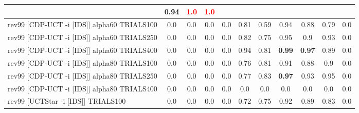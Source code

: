 \documentclass{article}
\begin{document}
\begin{tabular}{|l|r@{$\pm$}rr@{$\pm$}rr@{$\pm$}rr@{$\pm$}rr@{$\pm$}rr@{$\pm$}rr@{$\pm$}rr@{$\pm$}rr@{$\pm$}rr@{$\pm$}r|}
& \multicolumn{2}{c}{0.94}
& \multicolumn{2}{c}{\textbf{\textcolor{red}{1.0}}}
& \multicolumn{2}{c|}{\textbf{\textcolor{red}{1.0}}}
\\
\hline
rev99 [CDP-UCT -i [IDS]] alpha60 TRIALS100
& \multicolumn{2}{c}{0.0}
& \multicolumn{2}{c}{0.0}
& \multicolumn{2}{c}{0.0}
& \multicolumn{2}{c}{0.0}
& \multicolumn{2}{c}{0.81}
& \multicolumn{2}{c}{0.59}
& \multicolumn{2}{c}{0.94}
& \multicolumn{2}{c}{0.88}
& \multicolumn{2}{c}{0.79}
& \multicolumn{2}{c|}{0.0}
\\
rev99 [CDP-UCT -i [IDS]] alpha60 TRIALS250
& \multicolumn{2}{c}{0.0}
& \multicolumn{2}{c}{0.0}
& \multicolumn{2}{c}{0.0}
& \multicolumn{2}{c}{0.0}
& \multicolumn{2}{c}{0.82}
& \multicolumn{2}{c}{0.75}
& \multicolumn{2}{c}{0.95}
& \multicolumn{2}{c}{0.9}
& \multicolumn{2}{c}{0.93}
& \multicolumn{2}{c|}{0.0}
\\
rev99 [CDP-UCT -i [IDS]] alpha60 TRIALS400
& \multicolumn{2}{c}{0.0}
& \multicolumn{2}{c}{0.0}
& \multicolumn{2}{c}{0.0}
& \multicolumn{2}{c}{0.0}
& \multicolumn{2}{c}{0.94}
& \multicolumn{2}{c}{0.81}
& \multicolumn{2}{c}{\textbf{0.99}}
& \multicolumn{2}{c}{\textbf{0.97}}
& \multicolumn{2}{c}{0.89}
& \multicolumn{2}{c|}{0.0}
\\
rev99 [CDP-UCT -i [IDS]] alpha80 TRIALS100
& \multicolumn{2}{c}{0.0}
& \multicolumn{2}{c}{0.0}
& \multicolumn{2}{c}{0.0}
& \multicolumn{2}{c}{0.0}
& \multicolumn{2}{c}{0.76}
& \multicolumn{2}{c}{0.81}
& \multicolumn{2}{c}{0.91}
& \multicolumn{2}{c}{0.88}
& \multicolumn{2}{c}{0.9}
& \multicolumn{2}{c|}{0.0}
\\
rev99 [CDP-UCT -i [IDS]] alpha80 TRIALS250
& \multicolumn{2}{c}{0.0}
& \multicolumn{2}{c}{0.0}
& \multicolumn{2}{c}{0.0}
& \multicolumn{2}{c}{0.0}
& \multicolumn{2}{c}{0.77}
& \multicolumn{2}{c}{0.83}
& \multicolumn{2}{c}{\textbf{0.97}}
& \multicolumn{2}{c}{0.93}
& \multicolumn{2}{c}{0.95}
& \multicolumn{2}{c|}{0.0}
\\
rev99 [CDP-UCT -i [IDS]] alpha80 TRIALS400
& \multicolumn{2}{c}{0.0}
& \multicolumn{2}{c}{0.0}
& \multicolumn{2}{c}{0.0}
& \multicolumn{2}{c}{0.0}
& \multicolumn{2}{c}{0.0}
& \multicolumn{2}{c}{0.0}
& \multicolumn{2}{c}{0.0}
& \multicolumn{2}{c}{0.0}
& \multicolumn{2}{c}{0.0}
& \multicolumn{2}{c|}{0.0}
\\
rev99 [UCTStar -i [IDS]] TRIALS100
& \multicolumn{2}{c}{0.0}
& \multicolumn{2}{c}{0.0}
& \multicolumn{2}{c}{0.0}
& \multicolumn{2}{c}{0.0}
& \multicolumn{2}{c}{0.72}
& \multicolumn{2}{c}{0.75}
& \multicolumn{2}{c}{0.92}
& \multicolumn{2}{c}{0.89}
& \multicolumn{2}{c}{0.83}
& \multicolumn{2}{c|}{0.0}

\end{tabular}
\end{document}
